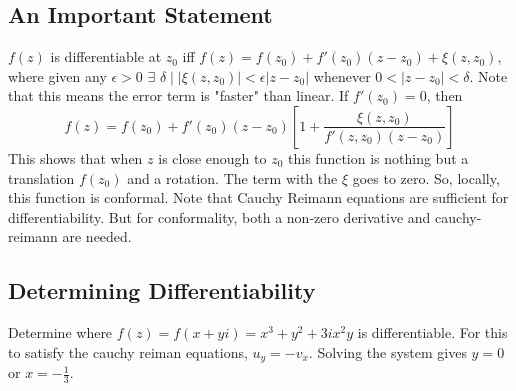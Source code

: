 \documentclass[../main.tex]{subfiles}
\begin{document}
    \subsection{An Important Statement}
        $f(z)$ is differentiable at $z_{0}$ iff $f(z)=f(z_{0})+f'(z_{0})(z-z_{0})+\xi(z,z_{0})$, where given any $\epsilon>0$ $\exists$ $\delta\mid |\xi(z,z_{0})|<\epsilon|z-z_{0}|$
        whenever $0<|z-z_{0}|<\delta$. Note that this means the error term is "faster" than linear. If $f'(z_{0})=0$, then 
        $$f(z)=f(z_{0})+f'(z_{0})(z-z_{0})\left[1+\frac{\xi(z,z_{0})}{f'(z,z_{0})(z-z_{0})}\right]$$
        This shows that when $z$ is close enough to $z_{0}$ this function is nothing but a translation $f(z_{0})$ and a rotation. The term with the $\xi$ goes to zero. So, locally,
        this function is conformal. Note that Cauchy Reimann equations are sufficient for differentiability. But for conformality, both a non-zero derivative and cauchy-reimann are needed.
    
    \subsection{Determining Differentiability}
        Determine where $f(z)=f(x+yi)=x^{3}+y^{2}+3ix^{2}y$ is differentiable. For this to satisfy the cauchy reiman equations,
        $u_{y}=-v_{x}$. Solving the system gives $y=0$ or $x=-\frac{1}{3}$.

    
\end{document}
